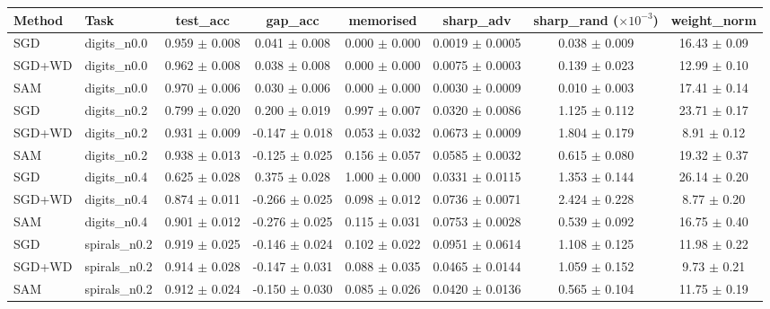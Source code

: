 \begin{tabular}{llcccccc}
\toprule
Method & Task & test\_acc & gap\_acc & memorised & sharp\_adv & sharp\_rand ($\times10^{-3}$) & weight\_norm \\
\midrule
SGD & digits\_n0.0 & 0.959 $\pm$ 0.008 & 0.041 $\pm$ 0.008 & 0.000 $\pm$ 0.000 & 0.0019 $\pm$ 0.0005 & 0.038 $\pm$ 0.009 & 16.43 $\pm$ 0.09 \\
SGD+WD & digits\_n0.0 & 0.962 $\pm$ 0.008 & 0.038 $\pm$ 0.008 & 0.000 $\pm$ 0.000 & 0.0075 $\pm$ 0.0003 & 0.139 $\pm$ 0.023 & 12.99 $\pm$ 0.10 \\
SAM & digits\_n0.0 & 0.970 $\pm$ 0.006 & 0.030 $\pm$ 0.006 & 0.000 $\pm$ 0.000 & 0.0030 $\pm$ 0.0009 & 0.010 $\pm$ 0.003 & 17.41 $\pm$ 0.14 \\
\midrule
SGD & digits\_n0.2 & 0.799 $\pm$ 0.020 & 0.200 $\pm$ 0.019 & 0.997 $\pm$ 0.007 & 0.0320 $\pm$ 0.0086 & 1.125 $\pm$ 0.112 & 23.71 $\pm$ 0.17 \\
SGD+WD & digits\_n0.2 & 0.931 $\pm$ 0.009 & -0.147 $\pm$ 0.018 & 0.053 $\pm$ 0.032 & 0.0673 $\pm$ 0.0009 & 1.804 $\pm$ 0.179 & 8.91 $\pm$ 0.12 \\
SAM & digits\_n0.2 & 0.938 $\pm$ 0.013 & -0.125 $\pm$ 0.025 & 0.156 $\pm$ 0.057 & 0.0585 $\pm$ 0.0032 & 0.615 $\pm$ 0.080 & 19.32 $\pm$ 0.37 \\
\midrule
SGD & digits\_n0.4 & 0.625 $\pm$ 0.028 & 0.375 $\pm$ 0.028 & 1.000 $\pm$ 0.000 & 0.0331 $\pm$ 0.0115 & 1.353 $\pm$ 0.144 & 26.14 $\pm$ 0.20 \\
SGD+WD & digits\_n0.4 & 0.874 $\pm$ 0.011 & -0.266 $\pm$ 0.025 & 0.098 $\pm$ 0.012 & 0.0736 $\pm$ 0.0071 & 2.424 $\pm$ 0.228 & 8.77 $\pm$ 0.20 \\
SAM & digits\_n0.4 & 0.901 $\pm$ 0.012 & -0.276 $\pm$ 0.025 & 0.115 $\pm$ 0.031 & 0.0753 $\pm$ 0.0028 & 0.539 $\pm$ 0.092 & 16.75 $\pm$ 0.40 \\
\midrule
SGD & spirals\_n0.2 & 0.919 $\pm$ 0.025 & -0.146 $\pm$ 0.024 & 0.102 $\pm$ 0.022 & 0.0951 $\pm$ 0.0614 & 1.108 $\pm$ 0.125 & 11.98 $\pm$ 0.22 \\
SGD+WD & spirals\_n0.2 & 0.914 $\pm$ 0.028 & -0.147 $\pm$ 0.031 & 0.088 $\pm$ 0.035 & 0.0465 $\pm$ 0.0144 & 1.059 $\pm$ 0.152 & 9.73 $\pm$ 0.21 \\
SAM & spirals\_n0.2 & 0.912 $\pm$ 0.024 & -0.150 $\pm$ 0.030 & 0.085 $\pm$ 0.026 & 0.0420 $\pm$ 0.0136 & 0.565 $\pm$ 0.104 & 11.75 $\pm$ 0.19 \\
\bottomrule
\end{tabular}
